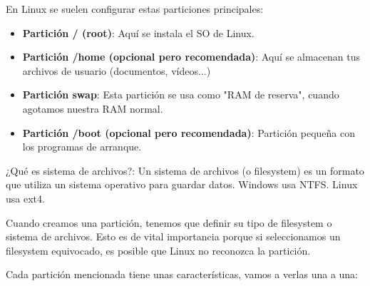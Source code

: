 En Linux se suelen configurar estas particiones principales:

\begin{itemize}
    \item \textbf{Partición / (root)}: Aquí se instala el SO de Linux.
    \item \textbf{Partición /home (opcional pero recomendada)}: Aquí se almacenan tus archivos de usuario (documentos, vídeos...)
    \item \textbf{Partición swap}: Esta partición se usa como "RAM de reserva", cuando agotamos nuestra RAM normal.
    \item \textbf{Partición /boot (opcional pero recomendada)}: Partición pequeña con los programas de arranque.
\end{itemize}

¿Qué es sistema de archivos?: Un sistema de archivos (o filesystem) es un formato que utiliza un sistema operativo para guardar datos. Windows usa NTFS. Linux usa ext4.

Cuando creamos una partición, tenemos que definir su tipo de filesystem o sistema de archivos. Esto es de vital importancia porque si seleccionamos un filesystem equivocado, es posible que Linux no reconozca la partición.

Cada partición mencionada tiene unas características, vamos a verlas una a una:

